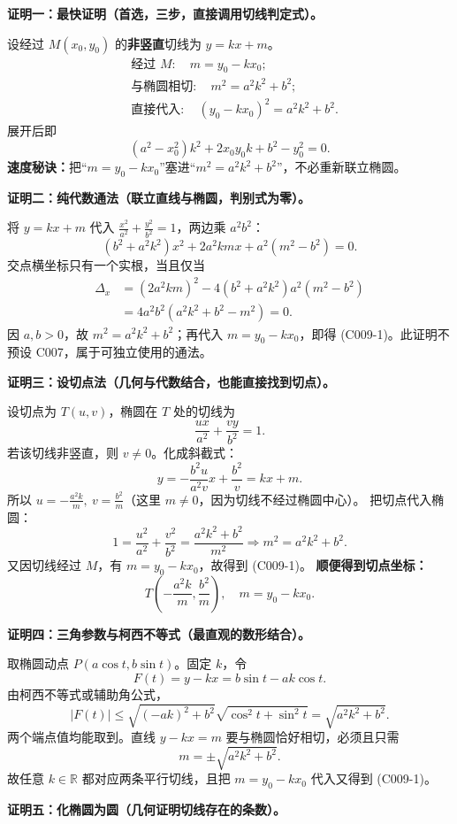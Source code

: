 \begin{proofbox}
\textbf{证明一：最快证明（首选，三步，直接调用切线判定式）。}

设经过 $M(x_0,y_0)$ 的\textbf{非竖直}切线为 $y=kx+m$。
\begin{align*}
&\text{经过 }M:\quad m=y_0-kx_0;\\
&\text{与椭圆相切}:\quad m^2=a^2k^2+b^2;\\
&\text{直接代入}:\quad (y_0-kx_0)^2=a^2k^2+b^2.
\end{align*}
展开后即
\[
\boxed{(a^2-x_0^2)k^2+2x_0y_0k+b^2-y_0^2=0.}
\]
\textbf{速度秘诀：}把“$m=y_0-kx_0$”塞进“$m^2=a^2k^2+b^2$”，不必重新联立椭圆。

\medskip
\textbf{证明二：纯代数通法（联立直线与椭圆，判别式为零）。}

将 $y=kx+m$ 代入 $\frac{x^2}{a^2}+\frac{y^2}{b^2}=1$，两边乘 $a^2b^2$：
\[
(b^2+a^2k^2)x^2+2a^2kmx+a^2(m^2-b^2)=0.
\]
交点横坐标只有一个实根，当且仅当
\begin{align*}
\Delta_x
&=(2a^2km)^2-4(b^2+a^2k^2)a^2(m^2-b^2)\\
&=4a^2b^2(a^2k^2+b^2-m^2)=0.
\end{align*}
因 $a,b>0$，故 $m^2=a^2k^2+b^2$；再代入 $m=y_0-kx_0$，即得 (C009-1)。此证明不预设 C007，属于可独立使用的通法。

\medskip
\textbf{证明三：设切点法（几何与代数结合，也能直接找到切点）。}

设切点为 $T(u,v)$，椭圆在 $T$ 处的切线为
\[
\frac{ux}{a^2}+\frac{vy}{b^2}=1.
\]
若该切线非竖直，则 $v\ne0$。化成斜截式：
\[
y=-\frac{b^2u}{a^2v}x+\frac{b^2}{v}=kx+m.
\]
所以 $u=-\frac{a^2k}{m},\ v=\frac{b^2}{m}$（这里 $m\ne0$，因为切线不经过椭圆中心）。
把切点代入椭圆：
\[
1=\frac{u^2}{a^2}+\frac{v^2}{b^2}
=\frac{a^2k^2+b^2}{m^2}
\Longrightarrow m^2=a^2k^2+b^2.
\]
又因切线经过 $M$，有 $m=y_0-kx_0$，故得到 (C009-1)。
\textbf{顺便得到切点坐标：}
\[
\boxed{T\left(-\frac{a^2k}{m},\frac{b^2}{m}\right),\quad m=y_0-kx_0.}
\]

\medskip
\textbf{证明四：三角参数与柯西不等式（最直观的数形结合）。}

取椭圆动点 $P(a\cos t,b\sin t)$。固定 $k$，令
\[
F(t)=y-kx=b\sin t-ak\cos t.
\]
由柯西不等式或辅助角公式，
\[
|F(t)|\le\sqrt{(-ak)^2+b^2}\sqrt{\cos^2t+\sin^2t}
=\sqrt{a^2k^2+b^2}.
\]
两个端点值均能取到。直线 $y-kx=m$ 要与椭圆恰好相切，必须且只需
\[
m=\pm\sqrt{a^2k^2+b^2}.
\]
故任意 $k\in\mathbb R$ 都对应两条平行切线，且把 $m=y_0-kx_0$ 代入又得到 (C009-1)。

\medskip
\textbf{证明五：化椭圆为圆（几何证明切线存在的条数）。}


\end{proofbox}
